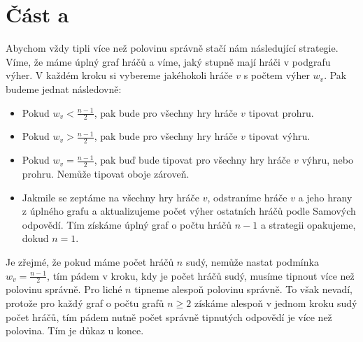 \documentclass{fkssolpub}
\author{Ondřej Sedláček}
\begin{document}
\section{Část a}

Abychom vždy tipli více než polovinu správně stačí nám následující
strategie. Víme, že máme úplný graf hráčů a víme, jaký stupně mají
hráči v podgrafu výher. V každém kroku si vybereme jakéhokoli
hráče $v$ s počtem výher $w_v$. Pak budeme jednat následovně:

\begin{itemize}
	\item Pokud $w_v < \frac{n - 1}{2}$,
	      pak bude pro všechny hry hráče $v$ tipovat prohru.
	\item Pokud $w_v > \frac{n - 1}{2}$,
	      pak bude pro všechny hry hráče $v$ tipovat výhru.
	\item Pokud $w_v = \frac{n - 1}{2}$, pak buď bude tipovat pro
	      všechny hry hráče $v$ výhru, nebo prohru. Nemůže tipovat oboje
	      zároveň.
	\item Jakmile se zeptáme na všechny hry hráče $v$, odstraníme
	      hráče $v$ a jeho hrany z úplného grafu a aktualizujeme počet
	      výher ostatních hráčů podle Samových odpovědí. Tím získáme
	      úplný graf o počtu hráčů $n - 1$ a strategii opakujeme, dokud
	      $n = 1$.
\end{itemize}

Je zřejmé, že pokud máme počet hráčů $n$ sudý, nemůže nastat podmínka
$w_v = \frac{n - 1}{2}$, tím pádem v kroku, kdy je počet hráčů sudý, musíme
tipnout více než polovinu správně. Pro liché $n$ tipneme alespoň polovinu
správně. To však nevadí, protože pro každý graf o počtu grafů $n \geq 2$
získáme alespoň v jednom kroku sudý počet hráčů, tím pádem nutně počet správně
tipnutých odpovědí je více než polovina. Tím je důkaz u konce.
\end{document}
